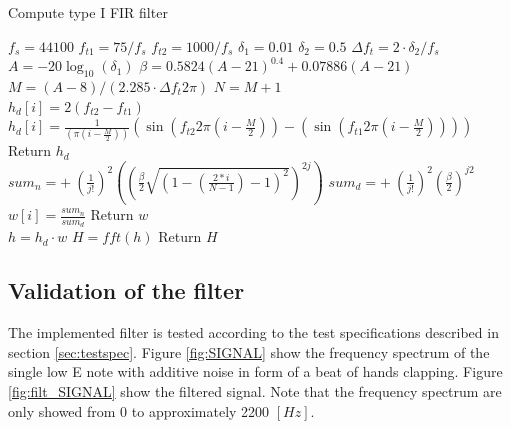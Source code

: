 \begin{algorithm}[H]
\caption{Compute type I FIR filter}
\label{alg:FIR}
\begin{algorithmic}[1] 
\State $f_s= 44100$ 
\State $f_{t1} = 75/f_s$ 
\State $f_{t2} = 1000/f_s$ 
\State $\delta_1 = 0.01$  
\State $\delta_2 = 0.5 $ 
\State $\Delta f_t = 2 \cdot \delta_2 / f_s$  
\\
\State $A=-20\log_{10}(\delta_1)$ 
\State $\beta = 0.5824(A-21)^{0.4} + 0.07886(A-21)$ 
\State $M = (A-8)/(2.285 \cdot \Delta f_t  2\pi)$ 
\State $N = M+1$ 
\\
        		\State $h_d[i] = 2(f_{t2} - f_{t1})$
        	\Else 
        		\State  $h_d[i] = \frac{1}{ (\pi (i - \frac{M}{2}))}(\sin(f_{t2} 2 \pi (i - \frac{M}{2})) - (\sin(f_{t1} 2 \pi (i - \frac{M}{2}))))$ 
        	\EndIf 
	\EndFor
	\State Return $h_d$
\EndProcedure
\\
			\State $ sum_n = + \ (\frac{1}{j!})^2 \left( \left( \frac{\beta}{2} \sqrt{\left(1 - \left( \frac{2*i}{N-1}\right) - 1\right)^2}\right)^{2j}\right)$
			\State $ sum_d = + \ (\frac{1}{j!})^2 \left( \frac{\beta}{2}\right)^{j2}$
		\EndFor
		\State $w[i]=\frac{sum_n}{sum_d}$
	\EndFor
	\State Return $w$
\EndProcedure
\\
	\State $h = h_d \cdot w$ 
	\State $H = fft(h)$ 
	\State Return $H$
\EndProcedure

\end{algorithmic}
\end{algorithm}

\subsection{Validation of the filter}
The implemented filter is tested according to the test specifications described in section \ref{sec:testspec}. Figure \ref{fig:SIGNAL} show the frequency spectrum of the single low E note with additive noise in form of a beat of hands clapping. Figure \ref{fig:filt_SIGNAL} show the filtered signal. Note that the frequency spectrum are only showed from 0 to approximately 2200 $[Hz]$.  

